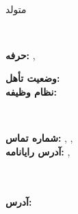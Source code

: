 \documentclass{./../../../../src/latex/classes/curriculumVitae}
\begin{document}
\iftoggle{Dev}{\par}{}
\noindent\parbox{50mm}
{\parbox{50mm}{\centering\Huge\bfseries\color{cyan}\fullName}\\\parbox{50mm}{\centering متولد \bornData}}\parbox{2mm}{\ }\parbox{138mm}
{\textbf{حرفه:} \ProfessionI, \ProfessionII\\\parbox{40mm}
{\textbf{وضعیت تأهل:} \maritalStatus\\\textbf{نظام وظیفه:} \militaryService}\parbox{2mm}{\ }\parbox{96mm}
{\textbf{شماره تماس:} \mobilePhoneI, \mobilePhoneII, \phoneNumber\\\textbf{آدرس رایانامه:} \emailI, \emailII}}\\\\
\textbf{آدرس:} \fullAddress\\

\descriptions

\education

\workExperience

\teaching

\project

\publication

\LicensesCertifications

\honorsAwards

\training

\languageS

\craft

\voluntary
\end{document}
